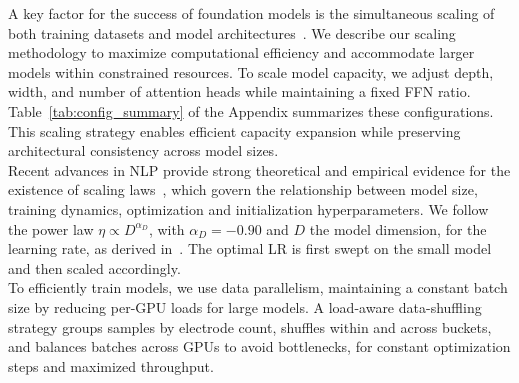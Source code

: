 \documentclass{article}
\begin{document}
A key factor for the success of foundation models is the simultaneous scaling of both training datasets and model architectures~\citep{touvron2023llama1}. We describe our scaling methodology to maximize computational efficiency and accommodate larger models within constrained resources.
To scale model capacity, we adjust depth, width, and number of attention heads while maintaining a fixed FFN ratio. Table~\ref{tab:config_summary} of the Appendix summarizes these configurations. This scaling strategy enables efficient capacity expansion while preserving architectural consistency across model sizes.
\\
Recent advances in NLP provide strong theoretical and empirical evidence for the existence of scaling laws~\citep{kaplan2020scaling, hoffmann2022training}, which govern the relationship between model size, training dynamics, optimization and initialization hyperparameters. We follow the power law $\eta \propto D^{\alpha_D}$, with $\alpha_D = -0.90$ and $D$ the model dimension, for the learning rate, as derived in~\citet{everett24scaling}. The optimal LR is first swept on the small model and then scaled accordingly.
\\
To efficiently train models, we use data parallelism, maintaining a constant batch size by reducing per-GPU loads for large models. A load-aware data-shuffling strategy groups samples by electrode count, shuffles within and across buckets, and balances batches across GPUs to avoid bottlenecks, for constant optimization steps and maximized throughput.
\end{document}
